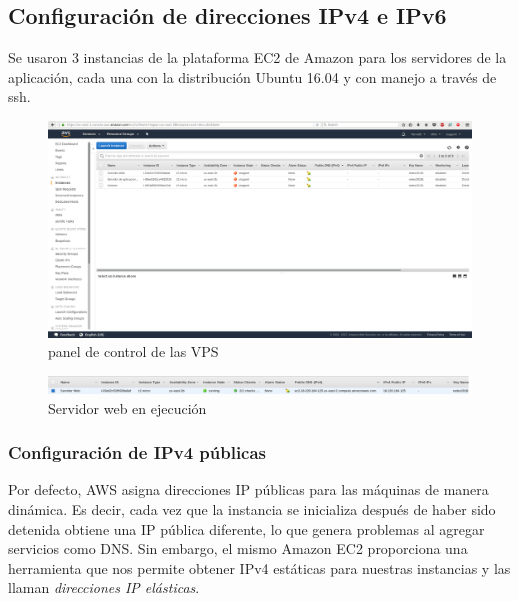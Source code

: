 \documentclass[12pt]{article}
\begin{document}
\newpage

\subsection{Configuración de direcciones IPv4 e IPv6} 
Se usaron 3 instancias de la plataforma \textsf{EC2} de Amazon para los servidores de la aplicación, cada una con la distribución \textsf{Ubuntu 16.04} y con manejo a través de \textsf{ssh}. 
\begin{figure}[H]
  \centering
  \includegraphics[width=\textwidth]{instances_dashboard}
  \caption{panel de control de las VPS}
\end{figure}
\begin{figure}[H]
  \centering
  \includegraphics[width=\textwidth]{web_server}
  \caption{Servidor web en ejecución}
\end{figure}

\subsubsection{Configuración de IPv4 públicas}
Por defecto, \textsf{AWS} asigna direcciones IP públicas para las máquinas de manera dinámica. Es decir, cada vez que la instancia se inicializa después de haber sido detenida obtiene una IP pública diferente, lo que genera problemas al agregar servicios como DNS. Sin embargo, el mismo \textsf{Amazon EC2} proporciona una herramienta que nos permite obtener IPv4 estáticas para nuestras instancias y las llaman \textit{direcciones IP elásticas}.\\
\end{document}
